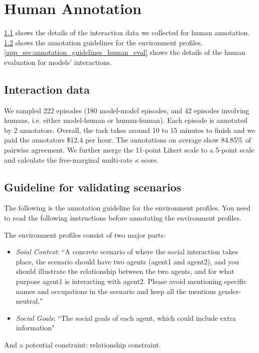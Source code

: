 \section{Human Annotation}
\ref{app_sec:interaction_data} shows the details of the interaction data we collected for human annotation. \ref{app_sec:annotation_guidelines} shows the annotation guidelines for the environment profiles. \ref{app_sec:annotation_guidelines_human_eval} shows the details of the human evaluation for models' interactions.
\label{app:human_annotation}

\subsection{Interaction data}
\label{app_sec:interaction_data}
We sampled 222 episodes (180 model-model episodes, and 42 episodes involving humans, i.e. either model-human or human-human). Each episode is annotated by 2 annotators. Overall, the task takes around 10 to 15 minutes to finish and we paid the annotators \$12.4 per hour. The annotations on average show 84.85\% of pairwise agreement. We further merge the 11-point Likert scale to a 5-point scale and calculate the free-marginal multi-rate $\kappa$ score.



\subsection{Guideline for validating scenarios}
\label{app_sec:annotation_guidelines}
The following is the annotation guideline for the environment profiles. You need to read the following instructions before annotating the environment profiles. 

The environment profiles consist of two major parts: 
\begin{itemize}
    \item \textit{Soial Context}: ``A concrete scenario of where the social interaction takes place, the scenario should have two agents (agent1 and agent2), and you should illustrate the relationship between the two agents, and for what purpose agent1 is interacting with agent2. Please avoid mentioning specific names and occupations in the scenario and keep all the mentions gender-neutral."
    \item \textit{Social Goals}: ``The social goals of each agent, which could include extra information"
\end{itemize}
And a potential constraint: relationship constraint. 

